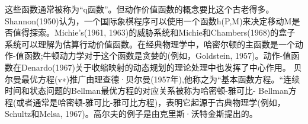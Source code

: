 这些函数通常被称为“q函数”。但动作价值函数的概念要比这个古老得多。Shannon(1950)认为，一个国际象棋程序可以使用一个函数h(P,M)来决定移动M是否值得探索。Michie’s(1961, 1963)的威胁系统和Michie和Chambers(1968)的盒子系统可以理解为估算行动价值函数。在经典物理学中，哈密尔顿的主函数是一个动作-值函数;牛顿动力学对于这个函数是贪婪的(例如，Goldstein, 1957)。动作-值函数在Denardo(1967)关于收缩映射的动态规划的理论处理中也发挥了中心作用。
贝尔曼最优方程(v∗)推广由理查德·贝尔曼(1957年),他称之为“基本函数方程。“连续时间和状态问题的Bellman最优方程的对应关系被称为哈密顿-雅可比- Bellman方程(或者通常是哈密顿-雅可比-雅可比方程)，表明它起源于古典物理学(例如，Schultz和Melsa, 1967)。高尔夫的例子是由克里斯·沃特金斯提出的。
